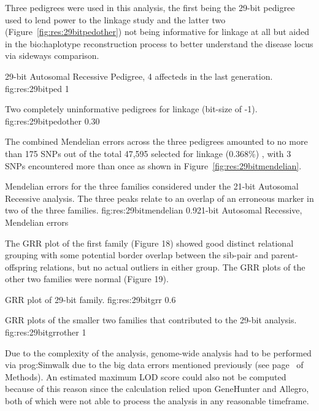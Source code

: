 Three pedigrees were used in this analysis, the first being the 29-bit pedigree used to lend power to the linkage study and the latter two (Figure~\ref{fig:res:29bitpedother}) not being informative for linkage at all but aided in the \gls{bio:haplotype} reconstruction process to better understand the disease locus via sideways comparison.

	{29-bit Autosomal Recessive Pedigree, 4 affecteds in the last generation.}
	{fig:res:29bitped}
	{1}{}

	{Two completely uninformative pedigrees for linkage (bit-size of -1).}
	{fig:res:29bitpedother}
	{0.30}{}

The combined Mendelian errors across the three pedigrees amounted to no more than 175 SNPs out of the total 47,595 selected for linkage (0.368\%) , with 3 SNPs encountered more than once as shown in Figure~\ref{fig:res:29bitmendelian}.

	{Mendelian errors for the three families considered under the 21-bit Autosomal Recessive analysis. The three peaks relate to an overlap of an erroneous marker in two of the three families.}
	{fig:res:29bitmendelian}
	{0.9}{21-bit Autosomal Recessive, Mendelian errors}

The GRR plot of the first family (Figure 18) showed good distinct relational grouping with some potential border overlap between the sib-pair and parent-offspring relations, but no actual outliers in either group. The GRR plots of the other two families were normal (Figure 19).

\vfill
{}
	{GRR plot of 29-bit family.}
	{fig:res:29bitgrr}
	{0.6}{}

	{GRR plots of the smaller two families that contributed to the 29-bit analysis.}
	{fig:res:29bitgrrother}
	{1}{}

Due to the complexity of the analysis, genome-wide analysis had to be performed via \gls{prog:Simwalk} due to the big data errors mentioned previously (see page~\pageref{ref:meth:allegrobigdata} of Methods). An estimated maximum LOD score could also not be computed because of this reason since the calculation relied upon GeneHunter and Allegro, both of which were not able to process the analysis in any reasonable timeframe.

